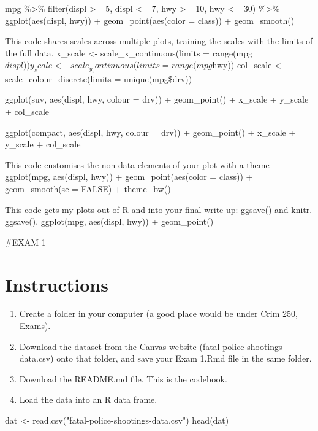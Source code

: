 \documentclass[
]{article}
\newenvironment{Shaded}{\begin{snugshade}}{\end{snugshade}}
\newcommand{\FunctionTok}[1]{\textcolor[rgb]{0.00,0.00,0.00}{#1}}
\newcommand{\NormalTok}[1]{#1}
\newcommand{\OtherTok}[1]{\textcolor[rgb]{0.56,0.35,0.01}{#1}}
\newcommand{\StringTok}[1]{\textcolor[rgb]{0.31,0.60,0.02}{#1}}
\begin{document}
mpg \%\textgreater\% filter(displ \textgreater= 5, displ \textless= 7,
hwy \textgreater= 10, hwy \textless= 30) \%\textgreater\%
ggplot(aes(displ, hwy)) + geom\_point(aes(color = class)) +
geom\_smooth()

This code shares scales across multiple plots, training the scales with
the limits of the full data. x\_scale \textless-
scale\_x\_continuous(limits =
range(mpg\(displ)) y_scale <- scale_y_continuous(limits = range(mpg\)hwy))
col\_scale \textless- scale\_colour\_discrete(limits = unique(mpg\$drv))

ggplot(suv, aes(displ, hwy, colour = drv)) + geom\_point() + x\_scale +
y\_scale + col\_scale

ggplot(compact, aes(displ, hwy, colour = drv)) + geom\_point() +
x\_scale + y\_scale + col\_scale

This code customises the non-data elements of your plot with a theme
ggplot(mpg, aes(displ, hwy)) + geom\_point(aes(color = class)) +
geom\_smooth(se = FALSE) + theme\_bw()

This code gets my plots out of R and into your final write-up: ggsave()
and knitr. ggsave(). ggplot(mpg, aes(displ, hwy)) + geom\_point()

\#EXAM 1

\hypertarget{instructions}{%
\section{Instructions}\label{instructions}}

\begin{enumerate}
\def\labelenumi{\alph{enumi}.}
\item
  Create a folder in your computer (a good place would be under Crim
  250, Exams).
\item
  Download the dataset from the Canvas website
  (fatal-police-shootings-data.csv) onto that folder, and save your Exam
  1.Rmd file in the same folder.
\item
  Download the README.md file. This is the codebook.
\item
  Load the data into an R data frame.
\end{enumerate}

\begin{Shaded}
\begin{Highlighting}[]
\NormalTok{dat }\OtherTok{\textless{}{-}} \FunctionTok{read.csv}\NormalTok{(}\StringTok{"fatal{-}police{-}shootings{-}data.csv"}\NormalTok{)}
\FunctionTok{head}\NormalTok{(dat)}
\end{Highlighting}
\end{Shaded}
\end{document}
